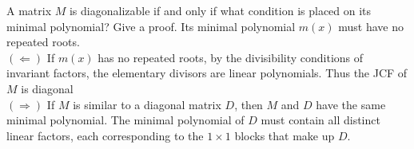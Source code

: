 \documentclass[avery5371,grid]{flashcards}
\begin{document}
\begin{flashcard}{A matrix $M$ is diagonalizable if and only if what condition is placed on its minimal polynomial? Give a proof.}
 Its minimal polynomial $m(x)$ must have no repeated roots.\\
 
 $(\Longleftarrow)$ If $m(x)$ has no repeated roots, by the divisibility conditions of invariant factors, the elementary divisors are linear polynomials. Thus the JCF of $M$ is diagonal\\
 
 $(\Longrightarrow)$ If $M$ is similar to a diagonal matrix $D$, then $M$ and $D$ have the same minimal polynomial. The minimal polynomial of $D$ must contain all distinct linear factors, each corresponding to the $1 \times 1$ blocks that make up $D$.
\end{flashcard}
\end{document}
